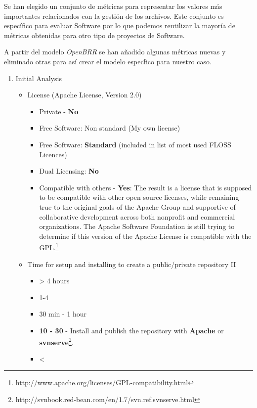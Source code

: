 \documentclass[11pt]{scrartcl}
\begin{document}
\par Se han elegido un conjunto de m\'etricas para representar los valores m\'as importantes relacionados con la gesti\'on de los archivos. Este conjunto es espec\'ifico para evaluar Software por lo que podemos reutilizar la mayor\'ia de m\'etricas obtenidas para otro tipo de proyectos de Software.

\par A partir del modelo \emph{OpenBRR} se han a\~nadido algunas m\'etricas nuevas y eliminado otras para as\'i crear el modelo espec\'fico para nuestro caso.

\begin{enumerate}
    \item Initial Analysis
    \begin{itemize}
        \item License (Apache License, Version 2.0)
        \begin{itemize} 
            \item Private - \textbf{No}
            \item Free Software: Non standard (My own license)
            \item Free Software: \textbf{Standard} (included in list of most used FLOSS Licences)
            \item Dual Licensing: \textbf{No}
            \item Compatible with others - \textbf{Yes}: The result is a license that is supposed to be compatible with other open source licenses, while remaining true to the original goals of the Apache Group and supportive of collaborative development across both nonprofit and commercial organizations. The Apache Software Foundation is still trying to determine if this version of the Apache License is compatible with the GPL.\footnote{http://www.apache.org/licenses/GPL-compatibility.html}    
        \end{itemize}
	    \item Time for setup and installing to create a public/private repository II
        \begin{itemize}
            \item \textgreater
 4 hours
            \item 1-4 
            \item 30 min - 1 hour
            \item \textbf{10 - 30} - Install and publish the repository with \textbf{Apache} or \textbf{svnserve}\footnote{http://svnbook.red-bean.com/en/1.7/svn.ref.svnserve.html}.
            \item \textless

\end{itemize}
\end{itemize}
\end{enumerate}
\end{document}
